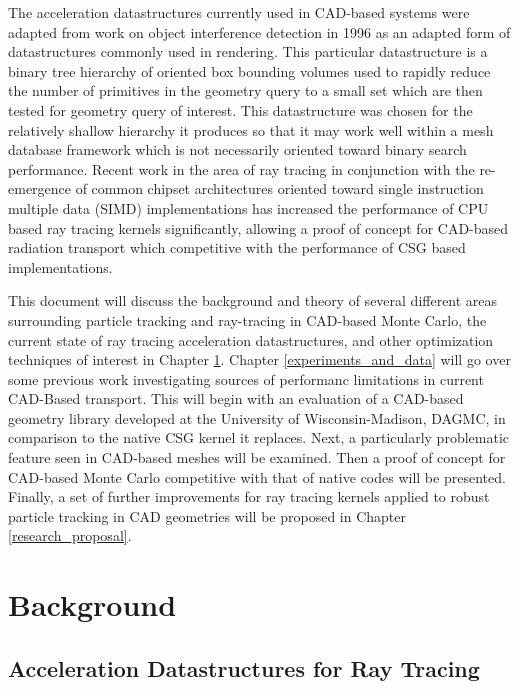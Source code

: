 \documentclass[12pt, a4paper]{article}
\begin{document}
The acceleration datastructures currently used in CAD-based systems were adapted from work on object interference detection in 1996\cite{Gottschalk_1996} as an adapted form of datastructures commonly used in rendering. This particular datastructure is a binary tree hierarchy of oriented box bounding volumes used to rapidly reduce the number of primitives in the geometry query to a small set which are then tested for geometry query of interest. This datastructure was chosen for the relatively shallow hierarchy it produces so that it may work well within a mesh database framework which is not necessarily oriented toward binary search performance. Recent work in the area of ray tracing in conjunction with the re-emergence of common chipset architectures oriented toward single instruction multiple data (SIMD) implementations has increased the performance of CPU based ray tracing kernels significantly\cite{Wald_2008}, allowing a proof of concept for CAD-based radiation transport which competitive with the performance of CSG based implementations.

This document will discuss the background and theory of several different areas surrounding particle tracking and ray-tracing in CAD-based Monte Carlo, the current state of ray tracing acceleration datastructures, and other optimization techniques of interest in Chapter \ref{background}. Chapter \ref{experiments_and_data} will go over some previous work investigating sources of performanc limitations in current CAD-Based transport. This will begin with an evaluation of a CAD-based geometry library developed at the University of Wisconsin-Madison, DAGMC, in comparison to the native CSG kernel it replaces. Next, a particularly problematic feature seen in CAD-based meshes will be examined. Then a proof of concept for CAD-based Monte Carlo competitive with that of native codes will be presented. Finally, a set of further improvements for ray tracing kernels applied to robust particle tracking in CAD geometries will be proposed in Chapter \ref{research_proposal}. 


\section{Background}%
\label{background}


\subsection{Acceleration Datastructures for Ray Tracing}
\label{subsec:accel_datastructures}
\end{document}
